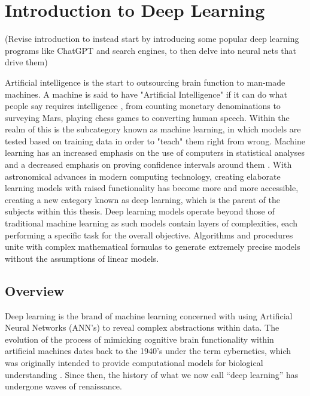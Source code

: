 \chapter{Introduction to Deep Learning}

(Revise introduction to instead start by introducing some popular deep learning programs like ChatGPT and search engines, to then delve into neural nets that drive them)

Artificial intelligence is the start to outsourcing brain function to man-made machines.  A machine is said to have "Artificial Intelligence" if it can do what people say requires intelligence \cite{jackson2019introduction}, from counting monetary denominations to surveying Mars, playing chess games to converting human speech.  Within the realm of this is the subcategory known as machine learning, in which models are tested based on training data in order to "teach" them right from wrong.  Machine learning has an increased emphasis on the use of computers in statistical analyses and a decreased emphasis on proving confidence intervals around them \cite{Goodfellow-et-al-2016}.  With astronomical advances in modern computing technology, creating elaborate learning models with raised functionality has become more and more accessible, creating a new category known as deep learning, which is the parent of the subjects within this thesis.  Deep learning models operate beyond those of traditional machine learning as such models contain layers of complexities, each performing a specific task for the overall objective.  Algorithms and procedures unite with complex mathematical formulas to generate extremely precise models without the assumptions of linear models.



\section{Overview} %

Deep learning is the brand of machine learning concerned with using Artificial Neural Networks (ANN's) to reveal complex abstractions within data.
The evolution of the process of mimicking cognitive brain functionality within artificial machines dates back to the 1940's under the term cybernetics, which was originally intended to provide computational models for biological understanding \cite{Goodfellow-et-al-2016}.  Since then, the history of what we now call ``deep learning'' has undergone waves of renaissance.

